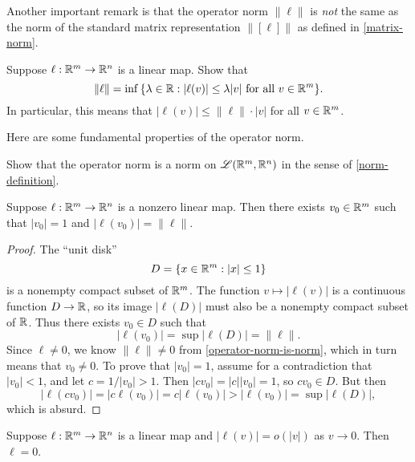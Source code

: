 Another important remark is that the operator norm $\|\ell\|$ is \emph{not} the same as the norm of the standard matrix representation $\|[\ell]\|$ as defined in \cref{matrix-norm}. 

\begin{exercise} \label{operator-norm-reformulation}
	Suppose $\ell : \mathbb{R}^m \to \mathbb{R}^n$ is a linear map. Show that 
	\[ \|\ell\| = \inf \, \{ \lambda \in \mathbb{R} : |\ell(v)| \leq \lambda |v| \text{ for all } v \in \mathbb{R}^m \}. \]
	In particular, this means that $|\ell(v)| \leq \|\ell\| \cdot |v|$ for all $v \in \mathbb{R}^m$. 
\end{exercise}

Here are some fundamental properties of the operator norm. 

\begin{exercise} \label{operator-norm-is-norm}
	Show that the operator norm is a norm on $\mathscr{L}(\mathbb{R}^m, \mathbb{R}^n)$ in the sense of \cref{norm-definition}. 
\end{exercise}

\begin{lemma} \label{norm-is-realized}
	Suppose $\ell : \mathbb{R}^m \to \mathbb{R}^n$ is a nonzero linear map. Then there exists $v_0 \in \mathbb{R}^m$ such that $|v_0| = 1$ and $|\ell(v_0)| = \|\ell\|$. 
\end{lemma}

\begin{proof}
	The ``unit disk'' \[ D = \{ x \in \mathbb{R}^m : |x| \leq 1 \} \]
	is a nonempty compact subset of $\mathbb{R}^m$. The function $v \mapsto |\ell(v)|$ is a continuous function $D \to \mathbb{R}$, so its image $|\ell(D)|$ must also be a nonempty compact subset of $\mathbb{R}$. Thus there exists $v_0 \in D$ such that 
	\[ |\ell(v_0)| = \sup |\ell(D)| = \|\ell\|. \]
	Since $\ell \neq 0$, we know $\|\ell\| \neq 0$ from \cref{operator-norm-is-norm}, which in turn means that $v_0 \neq 0$. To prove that $|v_0| = 1$, assume for a contradiction that $|v_0| < 1$, and let $c = 1/|v_0| > 1$. Then $|cv_0| = |c||v_0| = 1$, so $cv_0 \in D$. But then
	\[ |\ell(cv_0)| = |c\ell(v_0)| = c|\ell(v_0)| > |\ell(v_0)| = \sup |\ell(D)|, \]
	which is absurd. 
\end{proof}

\begin{lemma} \label{linear-and-small}
	Suppose $\ell : \mathbb{R}^m \to \mathbb{R}^n$ is a linear map and $|\ell(v)| = o(|v|)$ as $v \to 0$. Then $\ell = 0$. 
\end{lemma}

